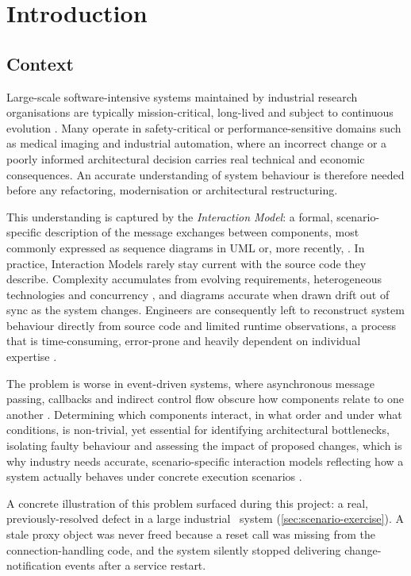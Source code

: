 \chapter{Introduction}\label{ch:introduction}

\section{Context}

Large-scale software-intensive systems maintained by industrial research
organisations are typically mission-critical, long-lived and subject to
continuous evolution \cite{systa:reverse}. Many operate in
safety-critical or performance-sensitive domains such as medical imaging
and industrial automation, where an incorrect change or a poorly
informed architectural decision carries real technical and economic
consequences. An accurate understanding of system behaviour is therefore
needed before any refactoring, modernisation or architectural
restructuring.

This understanding is captured by the \emph{Interaction Model}: a
formal, scenario-specific description of the message exchanges between
components, most commonly expressed as sequence diagrams in \ac{UML} or,
more recently, \sysml. In practice, Interaction Models rarely stay
current with the source code they describe. Complexity accumulates
from evolving requirements, heterogeneous technologies and concurrency
\cite{systa:reverse}, and diagrams accurate when drawn drift out of sync
as the system changes. Engineers are consequently left to reconstruct
system behaviour directly from source code and limited runtime
observations, a process that is time-consuming, error-prone and heavily
dependent on individual expertise \cite{systa:reverse}.

The problem is worse in event-driven systems, where asynchronous
message passing, callbacks and indirect control flow obscure how
components relate to one another \cite{cornelissen:systematic}.
Determining which components interact, in what order and under what
conditions, is non-trivial, yet essential for identifying architectural
bottlenecks, isolating faulty behaviour and assessing the impact of
proposed changes, which is why industry needs accurate,
scenario-specific interaction models reflecting how a system actually
behaves under concrete execution scenarios \cite{egyed:scenario}.

A concrete illustration of this problem surfaced during this project: a
real, previously-resolved defect in a large industrial \Cpp\ system
(\cref{sec:scenario-exercise}). A stale proxy object was never freed
because a reset call was missing from the connection-handling code, and
the system silently stopped delivering change-notification events after
a service restart.

